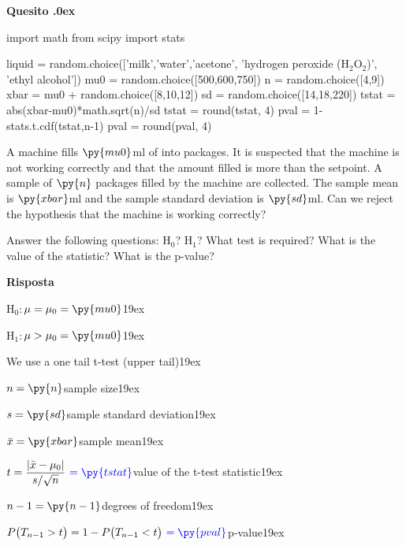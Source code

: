 \documentclass[11pt,twoside,a4paper]{article}
\newcounter{quesito}
\newenvironment{question}{\bigskip\addtocounter{quesito}{1}\bigskip\bigskip\par\textbf{Quesito \thequesito.\kern0ex}}{\par\vspace{\parskip}}
\newenvironment{answer}{\par\textbf{Risposta\quad}}{\par\vspace{\parskip}}
\begin{document}
\clearpage
\begin{question}
\begin{pycode}
import math
from scipy import stats

liquid = random.choice(['milk','water','acetone', 'hydrogen peroxide (H$_2$O$_2$)', 'ethyl alcohol'])
mu0 = random.choice([500,600,750])
n = random.choice([4,9])
xbar = mu0 + random.choice([8,10,12])
sd = random.choice([14,18,220])
tstat = abs(xbar-mu0)*math.sqrt(n)/sd
tstat = round(tstat, 4)
pval = 1-stats.t.cdf(tstat,n-1)
pval = round(pval, 4)
\end{pycode}
A machine fills $\py{mu0}$ml of  into packages. It is suspected that the machine is not working correctly and that the amount filled is more than the setpoint. A sample of $\py{n}$ packages filled by the machine are collected. The sample mean is $\py{xbar}$ml and the sample standard deviation is $\py{sd}$ml. Can we reject the hypothesis that the machine is working correctly?

Answer the following questions: H$_0$? H$_1$? What test is required? What is the value of the statistic? What is the p-value? 


\begin{answer}

  H$_0:$\hfill $\mu = \mu_0 = \py{mu0}$\kern19ex
  
  H$_1:$\hfill $\mu>\mu_0 = \py{mu0}$\kern19ex
  
  We use a one tail t-test (upper tail)\kern19ex
  
  $n = \py{n}$\hfill sample size\kern19ex
  
  $s = \py{sd}$\hfill sample standard deviation\kern19ex
  
  $\bar{x} = \py{xbar}$\hfill sample mean\kern19ex
  
  $t = \displaystyle\frac{|\bar{x}-\mu_0|}{s/\sqrt{n}}\ {\color{blue} = \py{tstat}}$\hfill value of the t-test statistic\kern19ex
  
  $n-1 = \py{n-1}$\hfill degrees of freedom\kern19ex
  
  $P\big(T_{n-1}>t\big) = 1- P\big(T_{n-1}<t\big)\ {\color{blue} = \py{pval}}$\hfill p-value\kern19ex

\end{answer}
\end{question}
\end{document}
